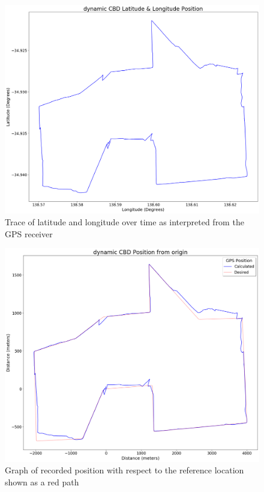 \begin{figure}[H]
    \begin{centering}
        \includegraphics[width=12cm,keepaspectratio]{Figures/21_3_30_dynamic_CBD_results Lat long position.png}
        \caption{Trace of latitude and longitude over time as interpreted from the GPS receiver}
        \label{fig:CBDdynamicCoord}
    \end{centering}
\end{figure}

\begin{figure}[H]
    \begin{centering}
        \includegraphics[width=12cm,keepaspectratio]{Figures/21_3_30_dynamic_CBD_results Position from origin.png}
        \caption{Graph of recorded position with respect to the reference location shown as a red path}
        \label{fig:CBDdynamicPosition}
    \end{centering}
\end{figure}


